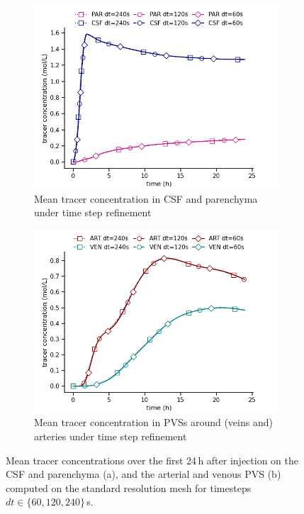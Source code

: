 \begin{figure}
    \centering
    \begin{subfigure}[b]{0.45\textwidth}
        \centering
        \includegraphics[width = 1 \linewidth]{figures/time_refinement_par_csf_mean.png}
        \caption{Mean tracer concentration in CSF and parenchyma under time step refinement}
    \end{subfigure}
    \begin{subfigure}[b]{0.45\textwidth}
        \centering
     \includegraphics[width= 1\linewidth]{figures/time_refinement_art_ven_mean.png}
         \caption{Mean tracer concentration in PVSs around (veins and) arteries under time step refinement}
    \end{subfigure}
    \caption{Mean tracer concentrations over the first 24\,h after injection on the CSF and parenchyma (a), and the arterial and venous PVS (b) computed on the standard resolution mesh for timesteps $dt \in \{60, 120, 240 \}$\,s.}    \label{fig:time_convergence_concentrations}
\end{figure}


